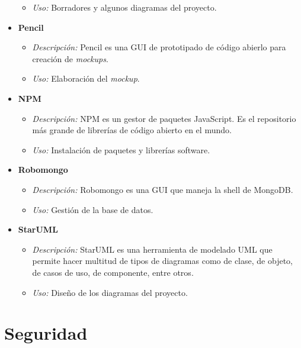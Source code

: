 \begin{itemize}
\begin{itemize}
\item \textit{Uso: }Borradores y algunos diagramas del proyecto.
\end{itemize}
\item \textbf{Pencil}
\begin{itemize}
\item \textit{Descripción: }Pencil es una GUI de prototipado de código abierlo para creación de \textit{mockups}\cite{pencil}.
\item \textit{Uso: }Elaboración del \textit{mockup}.
\end{itemize}
\item \textbf{NPM}
\begin{itemize}
\item \textit{Descripción: }NPM es un gestor de paquetes JavaScript. Es el repositorio más grande de librerías de código abierto en el mundo\cite{npm}. 
\item \textit{Uso: }Instalación de paquetes y librerías software.
\end{itemize}
\item \textbf{Robomongo}
\begin{itemize}
\item \textit{Descripción: }Robomongo es una GUI que maneja la shell de MongoDB\cite{robomongo}.
\item \textit{Uso: }Gestión de la base de datos.
\end{itemize}
\item \textbf{StarUML}
\begin{itemize}
\item \textit{Descripción: }StarUML es una herramienta de modelado UML que permite hacer multitud de tipos de diagramas como de clase, de objeto, de casos de uso, de componente, entre otros\cite{staruml}. 
\item \textit{Uso: }Diseño de los diagramas del proyecto.
\end{itemize}
\end{itemize}

\section{Seguridad}
